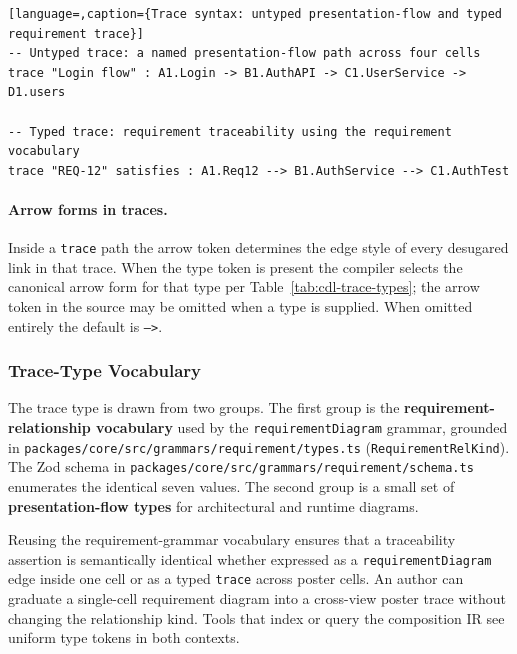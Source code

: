 \begin{lstlisting}[language=,caption={Trace syntax: untyped presentation-flow and typed requirement trace}]
-- Untyped trace: a named presentation-flow path across four cells
trace "Login flow" : A1.Login -> B1.AuthAPI -> C1.UserService -> D1.users

-- Typed trace: requirement traceability using the requirement vocabulary
trace "REQ-12" satisfies : A1.Req12 --> B1.AuthService --> C1.AuthTest
\end{lstlisting}

\paragraph{Arrow forms in traces.}

Inside a \texttt{trace} path the arrow token determines the edge style of
every desugared link in that trace.  When the type token is present the
compiler selects the canonical arrow form for that type per
Table~\ref{tab:cdl-trace-types}; the arrow token in the source may be omitted
when a type is supplied.  When omitted entirely the default is \texttt{-->}.

\subsubsection{Trace-Type Vocabulary}
\label{sec:cdl-trace-vocab}

The trace type is drawn from two groups.  The first group is the
\textbf{requirement-relationship vocabulary} used by the
\texttt{requirementDiagram} grammar, grounded in
\texttt{packages/core/src/grammars/requirement/types.ts}
(\texttt{RequirementRelKind}).  The Zod schema in
\texttt{packages/core/src/grammars/requirement/schema.ts} enumerates
the identical seven values.  The second group is a small set of
\textbf{presentation-flow types} for architectural and runtime diagrams.

Reusing the requirement-grammar vocabulary ensures that a traceability
assertion is semantically identical whether expressed as a
\texttt{requirementDiagram} edge inside one cell or as a typed \texttt{trace}
across poster cells.  An author can graduate a single-cell requirement diagram
into a cross-view poster trace without changing the relationship kind.  Tools
that index or query the composition IR see uniform type tokens in both
contexts.

